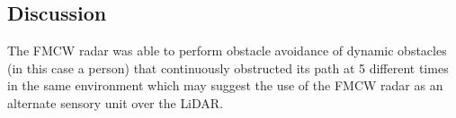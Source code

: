 \subsection{Discussion}
 The \ac{FMCW} radar was able to perform 
obstacle avoidance of dynamic obstacles (in this case a person) that continuously obstructed its path at 5 different times in the same environment which may suggest the use of the \ac{FMCW} \ac{radar} as an alternate sensory unit over the \ac{LiDAR}.
